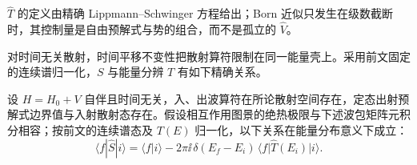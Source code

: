 $\hat T$ 的定义由精确 Lippmann--Schwinger 方程给出；Born 近似只发生在级数截断时，其控制量是自由预解式与势的组合，而不是孤立的 $\hat V$。

对时间无关散射，时间平移不变性把散射算符限制在同一能量壳上。采用前文固定的连续谱归一化，$S$ 与能量分辨 $T$ 有如下精确关系。
\begin{proposition}[定态散射的能量壳关系]
设 $H=H_0+V$ 自伴且时间无关，入、出波算符在所论散射空间存在，定态出射预解式边界值与入射散射态存在。假设相互作用图景的绝热极限与下述波包矩阵元积分相容；按前文的连续谱态及 $T(E)$ 归一化，以下关系在能量分布意义下成立：
\begin{equation}
 \boxed{
 \langle f|\hat S|i\rangle
 =\langle f|i\rangle
 -2\pi\ii\,\delta(E_f-E_i)\,
 \langle f|\hat T(E_i)|i\rangle.}
 \label{eq:S-T-energy-r68}
\end{equation}
\end{proposition}
